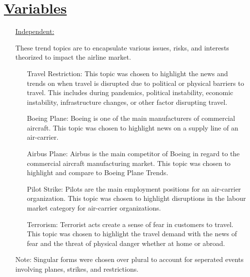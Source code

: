 \documentclass[12pt]{report}
\begin{document}
\section*{\underline{Variables}}
\begin{enumerate}
 \item[\underline{Independent:}]
    These trend topics are to encapsulate various issues, risks, and interests theorized to impact the airline market.
        \begin{enumerate}
            \item[Travel Restriction:] This topic was chosen to highlight the news and trends on when travel is disrupted due to political or physical barriers to travel.
            This includes during pandemics, political instability, economic instability, infrastructure changes, or other factor disrupting travel.
            \item[Boeing Plane:] Boeing is one of the main manufacturers of commercial aircraft.
            This topic was chosen to highlight news on a supply line of an air-carrier.
            \item[Airbus Plane:] Airbus is the main competitor of Boeing in regard to the commercial aircraft manufacturing market.
            This topic was chosen to highlight and compare to Boeing Plane Trends.
            \item[Pilot Strike:] Pilots are the main employment positions for an air-carrier organization.
            This topic was chosen to highlight disruptions in the labour market category for air-carrier organizations.
            \item[Terrorism:] Terrorist acts create a sense of fear in customers to travel.
            This topic was chosen to highlight the travel demand with the news of fear and the threat of physical danger whether at home or abroad.
        \end{enumerate}
{\tiny Note: Singular forms were chosen over plural to account for seperated events involving planes, strikes, and restrictions.}



\end{enumerate}
\end{document}
